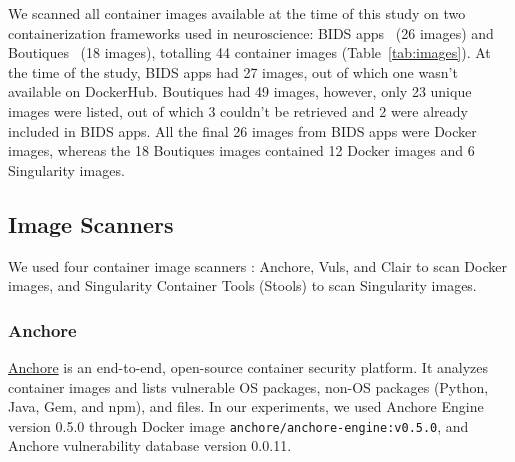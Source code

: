 We scanned all container images available at the time of this study on two containerization frameworks
used in neuroscience: BIDS
apps~\cite{gorgolewski2017bids} (26 images) and Boutiques~\cite{glatard2018boutiques} (18 images),
totalling
44 container images (Table~\ref{tab:images}). At the time of the study, BIDS apps had 27 images,
out of which one wasn't available on DockerHub. Boutiques had 49 images,
however, only 23 unique images were listed, out of which 3 couldn't be retrieved and 2
were already included in BIDS apps. All the final 26 images
from BIDS apps were Docker images, whereas the 18 Boutiques images contained 12 Docker images
and 6 Singularity images.

\subsection{Image Scanners}

We used four container image scanners : Anchore, Vuls, and
Clair to scan Docker images, and Singularity Container Tools
(Stools) to scan Singularity images.

\subsubsection{Anchore}

\href{https://github.com/anchore/anchore-engine}{Anchore} is an end-to-end, open-source container security platform. It
analyzes container images and lists vulnerable OS
packages, non-OS packages (Python, Java, Gem, and npm), and files.
In our experiments, we used Anchore Engine version 0.5.0 through Docker image \texttt{anchore/anchore-engine:v0.5.0}, and
Anchore vulnerability database version 0.0.11.

%


